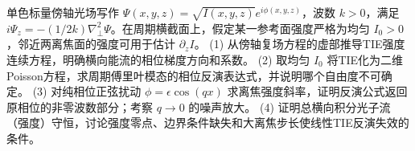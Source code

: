 单色标量傍轴光场写作 \(\Psi(x,y,z)=\sqrt{I(x,y,z)}e^{i\phi(x,y,z)}\)，波数 \(k>0\)，满足 \(i\Psi_z=-(1/2k)\nabla_\perp^2\Psi\)。在周期横截面上，假定某一参考面强度严格为均匀 \(I_0>0\)，邻近两离焦面的强度可用于估计 \(\partial_zI\)。
(1) 从傍轴复场方程的虚部推导TIE强度连续方程，明确横向能流的相位梯度方向和系数。
(2) 取均匀 \(I_0\) 将TIE化为二维Poisson方程，求周期傅里叶模态的相位反演表达式，并说明哪个自由度不可确定。
(3) 对纯相位正弦扰动 \(\phi=\epsilon\cos(qx)\) 求离焦强度斜率，证明反演公式返回原相位的非零波数部分；考察 \(q\to0\) 的噪声放大。
(4) 证明总横向积分光子流（强度）守恒，讨论强度零点、边界条件缺失和大离焦步长使线性TIE反演失效的条件。
